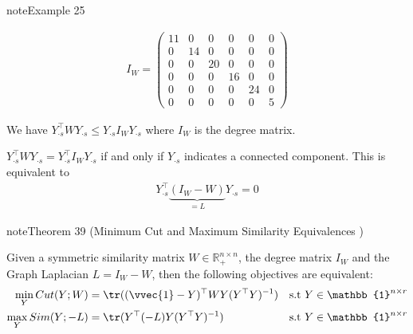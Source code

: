 \documentclass[letterpaper,10pt,english]{jupyterBook}
\begin{document}
\begin{sphinxadmonition}{note}{Example 25}


\begin{center}\end{center}\begin{equation*}
\begin{split}I_W = 
\begin{pmatrix}
    11 & 0 & 0 & 0 & 0 & 0\\
    0 & 14 & 0 & 0 & 0 & 0\\
    0 & 0 & 20 & 0 & 0 & 0\\
    0 & 0 & 0 & 16 & 0 & 0\\
    0 & 0 & 0 & 0 & 24 & 0\\
    0 & 0 & 0 & 0 & 0 & 5
\end{pmatrix}\end{split}
\end{equation*}\end{sphinxadmonition}

\sphinxAtStartPar
We have \(Y_{\cdot s}^\top WY_{\cdot s}\leq Y_{\cdot s}I_WY_{\cdot s} \) where \(I_W\) is the degree matrix.

\sphinxAtStartPar
\(Y_{\cdot s}^\top WY_{\cdot s}=Y_{\cdot s}^\top I_WY_{\cdot s}\) if and only if \(Y_{\cdot s}\) indicates a connected component. This is equivalent to
\begin{equation*}
\begin{split}Y_{\cdot s}^\top \underbrace{(I_W - W)}_{=L}Y_{\cdot s }=0\end{split}
\end{equation*}
\label{clustering_spectral:theorem-2}
\begin{sphinxadmonition}{note}{Theorem 39 (Minimum Cut and Maximum Similarity Equivalences )}



\sphinxAtStartPar
Given a symmetric similarity matrix \(W\in\mathbb{R}^{n\times n}_+\), the degree matrix \(I_W\) and the Graph Laplacian \(L=I_W-W\), then the following objectives are equivalent:
\begin{align*}
    \min_YCut(Y;W)  &= \tr((\vvec{1}-Y)^\top WY(Y^\top Y)^{-1}) &\text{s.t }Y\in\mathbb{1}^{n\times r} \\
    \max_Y Sim(Y;-L) &= \tr(Y^\top (-L) Y(Y^\top Y)^{-1}) &\text{s.t }Y\in\mathbb{1}^{n\times r}
\end{align*}\end{sphinxadmonition}
\end{document}
